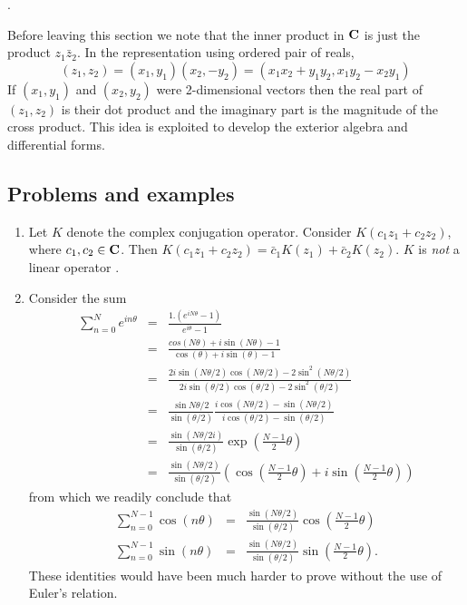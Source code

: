 {\color{red}{Add Lagrange's identity}}.

Before leaving this section we note that the inner product in $\mathbf{C}$ is just
the product $z_1\bar{z}_2$. In the representation using ordered pair of reals,
\[
(z_1, z_2) = (x_1, y_1)(x_2, -y_2) = (x_1x_2 + y_1y_2, x_1y_2 - x_2y_1)
\]
If $(x_1, y_1)$ and $(x_2, y_2)$ were 2-dimensional vectors then the real part
of $(z_1, z_2)$ is their dot product and the imaginary part is the magnitude of
the cross product. This idea is exploited to develop the exterior algebra and
differential forms.

\subsection{Problems and examples}
\begin{enumerate}
\item Let $K$ denote the complex conjugation operator. Consider $K(c_1z_1 + 
c_2z_2)$, where $c_1, c_2 \in \mathbf{C}$. Then $K(c_1z_1 + c_2z_2) = \bar{c}_1K(z_1)
+ \bar{c}_2K(z_2)$. $K$ is \emph{not} a linear operator \cite{aw}.

\item Consider the sum \cite{aw}
\begin{eqnarray*}
\sum_{n=0}^N e^{in\theta} &=& \frac{1.(e^{iN\theta} - 1)}{e^{i\theta} - 1} \\
 &=& \frac{cos(N\theta)+i\sin(N\theta)-1}{\cos(\theta) + i\sin(\theta) - 1} \\
 &=& \frac{2i\sin(N\theta/2)\cos(N\theta/2) - 2\sin^2(N\theta/2)}
     {2i\sin(\theta/2)\cos(\theta/2) - 2\sin^2(\theta/2)} \\
 &=& \frac{\sin{N\theta/2}}{\sin(\theta/2)}
     \frac{i\cos(N\theta/2)-\sin(N\theta/2)}{i\cos(\theta/2)-\sin(\theta/2)} \\
 &=& \frac{\sin{(N\theta/2i)}}{\sin(\theta/2)}
     \exp\left(\frac{N-1}{2}\theta\right) \\
 &=& \frac{\sin{(N\theta/2)}}{\sin(\theta/2)}\left(
     \cos\left(\frac{N-1}{2}\theta\right)+i\sin\left(\frac{N-1}{2}\theta\right)
     \right)
\end{eqnarray*}
from which we readily conclude that
\begin{eqnarray}
\sum_{n=0}^{N-1}\cos(n\theta) &=& \frac{\sin{(N\theta/2)}}{\sin(\theta/2)}
                                  \cos\left(\frac{N-1}{2}\theta\right)  
                                  \label{c1s3e12} \\
\sum_{n=0}^{N-1}\sin(n\theta) &=& \frac{\sin{(N\theta/2)}}{\sin(\theta/2)}
                                  \sin\left(\frac{N-1}{2}\theta\right).
								  \label{c1s3e13}
\end{eqnarray}
These identities would have been much harder to prove without the use of 
Euler's relation.


\end{enumerate}
